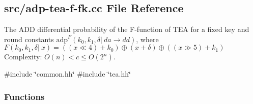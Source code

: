 \hypertarget{adp-tea-f-fk_8cc}{\subsection{src/adp-\/tea-\/f-\/fk.cc \-File \-Reference}
\label{adp-tea-f-fk_8cc}
}


\-The \-A\-D\-D differential probability of the \-F-\/function of \-T\-E\-A for a fixed key and round constants $\mathrm{adp}^{F}(k_0, k_1, \delta |~ da \rightarrow dd)$, where $ F(k_0, k_1, \delta |~ x) = ((x \ll 4) + k_0) \oplus (x + \delta) \oplus ((x \gg 5) + k_1)$ \-Complexity\-: $ O(n) < c \le O(2^n) $.  


{\ttfamily \#include \char`\"{}common.\-hh\char`\"{}}\*
{\ttfamily \#include \char`\"{}tea.\-hh\char`\"{}}\*
\subsubsection*{\-Functions}

